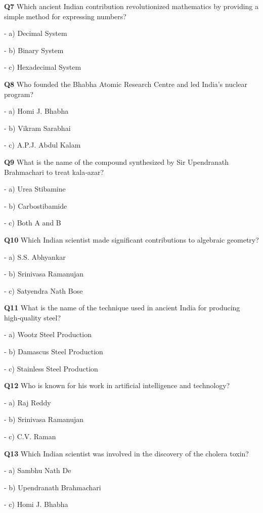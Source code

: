 \textbf{Q7} Which ancient Indian contribution revolutionized mathematics by providing a simple method for expressing numbers?\par
\quad - a) Decimal System\par
\quad - b) Binary System\par
\quad - c) Hexadecimal System\par

\textbf{Q8} Who founded the Bhabha Atomic Research Centre and led India's nuclear program?\par
\quad - a) Homi J. Bhabha\par
\quad - b) Vikram Sarabhai\par
\quad - c) A.P.J. Abdul Kalam\par

\textbf{Q9} What is the name of the compound synthesized by Sir Upendranath Brahmachari to treat kala‑azar?\par
\quad - a) Urea Stibamine\par
\quad - b) Carbostibamide\par
\quad - c) Both A and B\par

\textbf{Q10} Which Indian scientist made significant contributions to algebraic geometry?\par
\quad - a) S.S. Abhyankar\par
\quad - b) Srinivasa Ramanujan\par
\quad - c) Satyendra Nath Bose\par

\textbf{Q11} What is the name of the technique used in ancient India for producing high‑quality steel?\par
\quad - a) Wootz Steel Production\par
\quad - b) Damascus Steel Production\par
\quad - c) Stainless Steel Production\par

\textbf{Q12} Who is known for his work in artificial intelligence and technology?\par
\quad - a) Raj Reddy\par
\quad - b) Srinivasa Ramanujan\par
\quad - c) C.V. Raman\par

\textbf{Q13} Which Indian scientist was involved in the discovery of the cholera toxin?\par
\quad - a) Sambhu Nath De\par
\quad - b) Upendranath Brahmachari\par
\quad - c) Homi J. Bhabha\par

